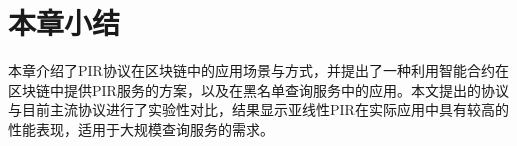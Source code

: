\section{本章小结}
本章介绍了PIR协议在区块链中的应用场景与方式，并提出了一种利用智能合约在区块链中提供PIR服务的方案，以及在黑名单查询服务中的应用。本文提出的协议与目前主流协议进行了实验性对比，结果显示亚线性PIR在实际应用中具有较高的性能表现，适用于大规模查询服务的需求。